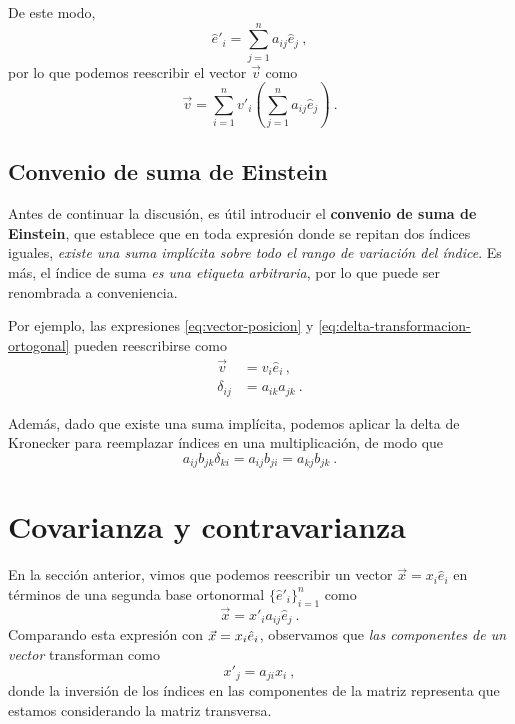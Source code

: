 De este modo, 
\begin{equation} \label{eq:transformacion-coordenadas}
    \hat{e}'_i = \sum_{j=1}^n a_{ij} \hat{e}_j \ ,
\end{equation}
por lo que podemos reescribir el vector $\vec{v}$ como
\begin{equation}
    \vec{v} = \sum_{i=1}^n v'_i \left( \sum_{j=1}^n a_{ij} \hat{e}_j \right) \ .
\end{equation}

\subsection{Convenio de suma de Einstein}

Antes de continuar la discusión, es útil introducir el  \textbf{convenio de suma de Einstein}, que establece que en toda expresión donde se repitan dos índices iguales, \emph{existe una suma implícita sobre todo el rango de variación del índice}. Es más, el índice de suma \emph{es una etiqueta arbitraria}, por lo que puede ser renombrada a conveniencia.

Por ejemplo, las expresiones \eqref{eq:vector-posicion} y \eqref{eq:delta-transformacion-ortogonal} pueden reescribirse como
\begin{align}
    \vec{v} & = v_i \hat{e}_i \, , \\
    \delta_{ij} & = a_{ik} a_{jk} \ .
\end{align}

Además, dado que existe una suma implícita, podemos aplicar la delta de Kronecker para reemplazar índices en una multiplicación, de modo que
\begin{equation}
    a_{ij} b_{jk} \delta_{ki} = a_{ij} b_{ji} = a_{kj} b_{jk} \ .
\end{equation}

\section{Covarianza y contravarianza}

En la sección anterior, vimos que podemos reescribir un vector $\vec{x} = x_i \hat{e}_i$ en términos de una segunda base ortonormal $\{\hat{e}'_i\}_{i=1}^n$ como
\begin{equation} \label{eq:transformacion-vector}
    \vec{x} = x'_i a_{ij} \hat{e}_j \ .
\end{equation}
Comparando esta expresión con $\vec{x} = x_i \hat{e}_i$, observamos que \emph{las componentes de un vector} transforman como
\begin{equation} \label{eq:transformacion-componentes}
    x'_j = a_{ji} x_i \ , 
\end{equation}
donde la inversión de los índices en las componentes de la matriz representa que estamos considerando la matriz transversa.

